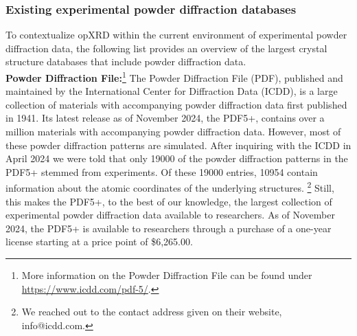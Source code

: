 
\pagebreak

\subsubsection*{Existing experimental powder diffraction databases}
To contextualize opXRD within the current environment of experimental powder diffraction data, the following list provides an overview of the largest crystal structure databases that include powder diffraction data.  \\

\textbf{Powder Diffraction File:}\footnote{More information on the Powder Diffraction File can be found under \url{https://www.icdd.com/pdf-5/}.} The Powder Diffraction File (PDF), published and maintained by the International Center for Diffraction Data (ICDD), is a large collection of materials with accompanying powder diffraction data first published in 1941. \cite{GatesRector2019} Its latest release as of November 2024, the PDF5+, contains over a million materials with accompanying powder diffraction data. However, most of these powder diffraction patterns are simulated. After inquiring with the ICDD in April 2024 we were told that only 19000 of the powder diffraction patterns in the PDF5+ stemmed from experiments. Of these 19000 entries, 10954 contain information about the atomic coordinates of the underlying structures. \footnote{We reached out to the contact address given on their website, info@icdd.com.} Still, this makes the PDF5+, to the best of our knowledge, the largest collection of experimental powder diffraction data available to researchers. As of November 2024, the PDF5+ is available to researchers through a purchase of a one-year license starting at a price point of \$6,265.00.\\


